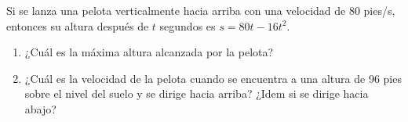 \item Si se lanza una pelota verticalmente hacia arriba con una velocidad de 80 pies/s, entonces su altura después de $t$ segundos es $s = 80t - 16t^2$.
\begin{enumerate}
    \item[(a)] ¿Cuál es la máxima altura alcanzada por la pelota?
    \item[(b)] ¿Cuál es la velocidad de la pelota cuando se encuentra a una altura de 96 pies sobre el nivel del suelo y se dirige hacia arriba? ¿Idem si se dirige hacia abajo?
\end{enumerate}
